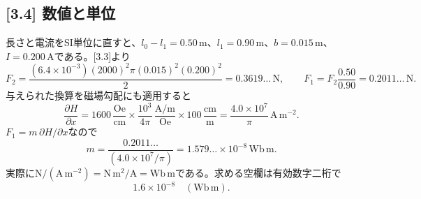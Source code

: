 \documentclass[11pt,a4paper]{article}
\begin{document}
\subsection*{[3.4] 数値と単位}
長さと電流をSI単位に直すと、$l_0-l_1=0.50\,\mathrm m$、$l_1=0.90\,\mathrm m$、$b=0.015\,\mathrm m$、$I=0.200\,\mathrm A$である。[3.3]より
\[
 F_2=\frac{(6.4\times10^{-3})(2000)^2\pi(0.015)^2(0.200)^2}{2}
 =0.3619\ldots\,\mathrm N,
 \qquad F_1=F_2\frac{0.50}{0.90}=0.2011\ldots\,\mathrm N.
\]
与えられた換算を磁場勾配にも適用すると
\[
 \frac{\partial H}{\partial x}
 =1600\,\frac{\mathrm{Oe}}{\mathrm{cm}}
 \times\frac{10^3}{4\pi}\,\frac{\mathrm{A/m}}{\mathrm{Oe}}
 \times100\,\frac{\mathrm{cm}}{\mathrm m}
 =\frac{4.0\times10^7}{\pi}\,\mathrm{A\,m^{-2}}.
\]
\enlargethispage{2\baselineskip}
$F_1=m\,\partial H/\partial x$なので
\[
 m=\frac{0.2011\ldots}{(4.0\times10^7/\pi)}
 =1.579\ldots\times10^{-8}\,\mathrm{Wb\,m}.
\]
実際に$\mathrm N/(\mathrm{A\,m^{-2}})=\mathrm{N\,m^2/A}=\mathrm{Wb\,m}$である。求める空欄は有効数字二桁で
\[
 \boxed{1.6\times10^{-8}}\quad(\mathrm{Wb\,m}).
\]
\end{document}
